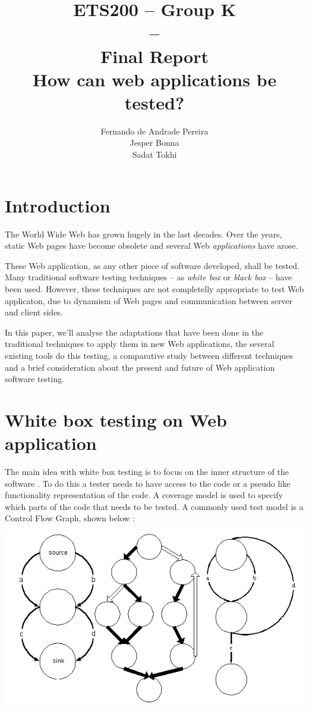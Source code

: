 \documentclass[a4paper]{article}
\title{ETS200 -- Group K\\--\\ Final Report \\
How can web applications be tested?
}
\author{Fernando de Andrade Pereira
\\Jesper Bonna
\\Sadat Tokhi
}
\begin{document}
\maketitle
\thispagestyle{empty}
\clearpage

\tableofcontents
\thispagestyle{empty}
\clearpage

\setcounter{page}{1}

\section{Introduction}
The World Wide Web has grown hugely in the last decades.
Over the years, static Web pages have become obsolete and several Web \emph{applications} have arose.

These Web application, as any other piece of software developed, shall be tested.
Many traditional software testing techniques  -- as \emph{white box} or \emph{black box} -- have been used.
However, these techniques are not completelly appropriate to test Web applicaton, due to dynamism of Web pages and communication between server and client sides.

In this paper, we'll analyse the adaptations that have been done in the traditional techniques to apply them in new Web applications, the several existing tools do this testing, a comparative study between different techniques and a brief consideration about the present and future of Web application software testing.

\section{White box testing on Web application}
The main idea with white box testing is to focus on the inner structure of the software \cite{ib03}. To do this
a tester needs to have access to the code or a pseudo like functionality representation of the code. A
coverage model is used to specify which parts of the code that needs to be tested. A commonly used
test model is a Control Flow Graph, shown below \cite{p91}:

\includegraphics[scale=1]{fig.png} 
\end{document}
